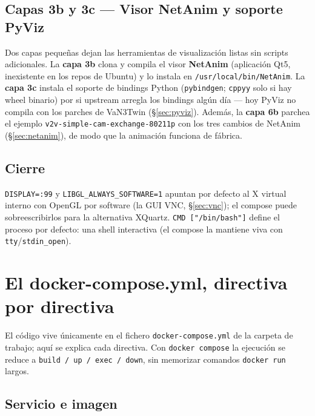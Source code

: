 \documentclass[11pt,a4paper]{article}
\begin{document}
\subsection{Capas 3b y 3c --- Visor NetAnim y soporte PyViz}

Dos capas peque\~nas dejan las herramientas de visualizaci\'on listas sin
scripts adicionales. La \textbf{capa 3b} clona y compila el visor
\textbf{NetAnim} (aplicaci\'on Qt5, inexistente en los repos de Ubuntu) y lo
instala en \texttt{/usr/local/bin/NetAnim}. La \textbf{capa 3c} instala el
soporte de bindings Python (\texttt{pybindgen}; \texttt{cppyy} solo si hay
wheel binario) por si upstream arregla los bindings alg\'un d\'ia --- hoy
PyViz no compila con los parches de VaN3Twin (\S\ref{sec:pyviz}). Adem\'as,
la \textbf{capa 6b} parchea el ejemplo
\texttt{v2v-simple-cam-exchange-80211p} con los tres cambios de NetAnim
(\S\ref{sec:netanim}), de modo que la animaci\'on funciona de f\'abrica.

\subsection{Cierre}

\begin{implicacion}
\texttt{DISPLAY=:99} y \texttt{LIBGL\_ALWAYS\_SOFTWARE=1} apuntan por defecto
al X virtual interno con OpenGL por software (la GUI VNC,
\S\ref{sec:vnc}); el compose puede sobreescribirlos para la alternativa
XQuartz. \texttt{CMD ["/bin/bash"]} define el proceso por
defecto: una shell interactiva (el compose la mantiene viva con
\texttt{tty}/\texttt{stdin\_open}).
\end{implicacion}

\clearpage

\section{El docker-compose.yml, directiva por directiva}

El c\'odigo vive \'unicamente en el fichero \texttt{docker-compose.yml} de la
carpeta de trabajo; aqu\'i se explica cada directiva. Con
\texttt{docker compose} la ejecuci\'on se reduce a \texttt{build / up / exec
/ down}, sin memorizar comandos \texttt{docker run} largos.

\subsection{Servicio e imagen}
\end{document}
